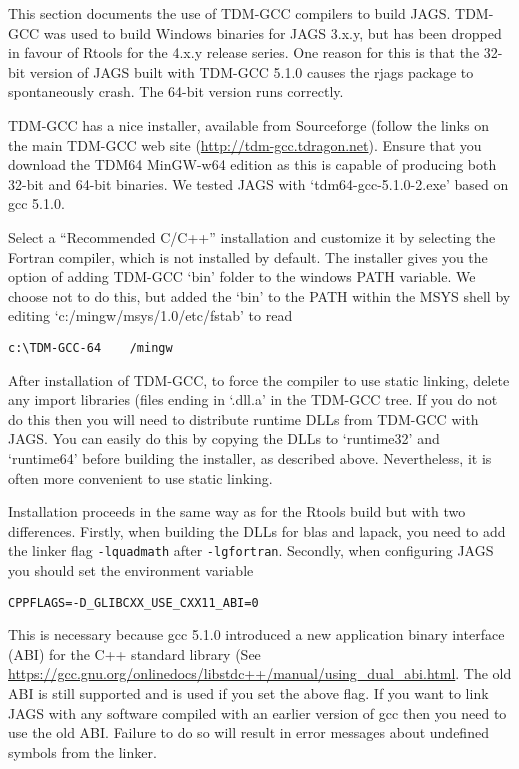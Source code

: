 \documentclass[11pt, a4paper, titlepage]{article}
\newcommand{\file}[1]{{`\normalfont\textsf{#1}'}}
\begin{document}
This section documents the use of TDM-GCC compilers to build JAGS.
TDM-GCC was used to build Windows binaries for JAGS 3.x.y, but has
been dropped in favour of Rtools for the 4.x.y release series. One
reason for this is that the 32-bit version of JAGS built with TDM-GCC
5.1.0 causes the rjags package to spontaneously crash. The 64-bit
version runs correctly.

TDM-GCC has a nice installer, available from Sourceforge (follow the
links on the main TDM-GCC web site
(\url{http://tdm-gcc.tdragon.net}). Ensure that you download the TDM64
MinGW-w64 edition as this is capable of producing both 32-bit and
64-bit binaries. We tested JAGS with \file{tdm64-gcc-5.1.0-2.exe}
based on gcc 5.1.0.

Select a ``Recommended C/C++'' installation and customize it by
selecting the Fortran compiler, which is not installed by default. The
installer gives you the option of adding TDM-GCC \file{bin} folder to
the windows PATH variable. We choose not to do this, but added the
\file{bin} to the PATH within the MSYS shell by editing
\file{c:/mingw/msys/1.0/etc/fstab} to read
\begin{verbatim}
c:\TDM-GCC-64    /mingw
\end{verbatim}
After installation of TDM-GCC, to force the compiler to use static
linking, delete any import libraries (files ending in \file{.dll.a} in
the TDM-GCC tree. If you do not do this then you will need to
distribute runtime DLLs from TDM-GCC with JAGS. You can easily do this
by copying the DLLs to \file{runtime32} and \file{runtime64} before
building the installer, as described above. Nevertheless, it is often
more convenient to use static linking.

Installation proceeds in the same way as for the Rtools build but with
two differences.  Firstly, when building the DLLs for blas and lapack,
you need to add the linker flag \verb+-lquadmath+ after
\verb+-lgfortran+. Secondly, when configuring JAGS you should set the
environment variable
\begin{verbatim}
CPPFLAGS=-D_GLIBCXX_USE_CXX11_ABI=0 
\end{verbatim}
This is necessary because gcc 5.1.0 introduced a new application
binary interface (ABI) for the C++ standard library (See
\url{https://gcc.gnu.org/onlinedocs/libstdc++/manual/using_dual_abi.html}. The
old ABI is still supported and is used if you set the above flag. If
you want to link JAGS with any software compiled with an earlier
version of gcc then you need to use the old ABI. Failure to do so will
result in error messages about undefined symbols from the linker.
\end{document}
